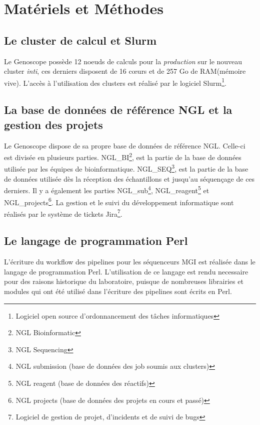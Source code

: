 \section{Matériels et Méthodes}
\subsection{Le cluster de calcul et Slurm}
Le Genoscope possède 12 noeuds de calculs pour la \emph{production} sur le nouveau cluster \emph{inti}, ces derniers disposent de 16 cœurs et de 257 Go de RAM(mémoire vive). L'accès à l'utilisation des clusters est réalisé par le logiciel Slurm\footnote{Logiciel open source d'ordonnancement des tâches informatiques}.

\subsection{La base de données de référence NGL et la gestion des projets}
Le Genoscope dispose de sa propre base de données de référence NGL. Celle-ci est divisée en plusieurs parties. NGL\_BI\footnote{NGL Bioinformatic}, est la partie de la base de données utilisée par les équipes de bioinformatique. NGL\_SEQ\footnote{NGL Sequencing}, est la partie de la base de données utilisée dès la réception des échantillons et jusqu'au séquençage de ces derniers. Il y a également les parties NGL\_sub\footnote{NGL submission (base de données des job soumis aux clusters)}, NGL\_reagent\footnote{NGL reagent (base de données des réactifs)} et NGL\_projects\footnote{NGL projects (base de données des projets en cours et passé)}. La gestion et le suivi du développement informatique sont réalisés par le système de tickets Jira\footnote{Logiciel de gestion de projet, d'incidents et de suivi de bugs}.

\subsection{Le langage de programmation Perl}
L'écriture du workflow des pipelines pour les séquenceurs MGI est réalisée dans le langage de programmation Perl. L'utilisation de ce langage est rendu necessaire pour des raisons historique du laboratoire, puisque de nombreuses librairies et modules qui ont été utilisé dans l'écriture des pipelines sont écrits en Perl.\\

